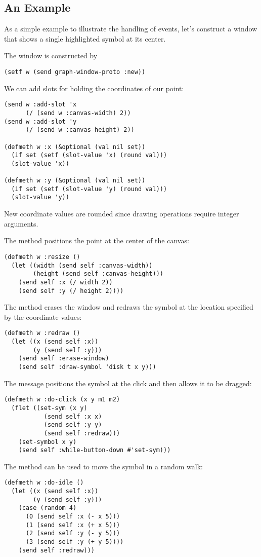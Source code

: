 \begin{slide}{}
\subsection{An Example}
As a simple example to illustrate the handling of events, let's
construct a window that shows a single highlighted symbol at its
center.

The window is constructed by
{\Large
\begin{verbatim}
(setf w (send graph-window-proto :new))
\end{verbatim}}
We can add slots for holding the coordinates of our point:
{\Large
\begin{verbatim}
(send w :add-slot 'x
      (/ (send w :canvas-width) 2))
(send w :add-slot 'y
      (/ (send w :canvas-height) 2))

(defmeth w :x (&optional (val nil set))
  (if set (setf (slot-value 'x) (round val)))
  (slot-value 'x))

(defmeth w :y (&optional (val nil set))
  (if set (setf (slot-value 'y) (round val)))
  (slot-value 'y))
\end{verbatim}}
New coordinate values are rounded since drawing operations require
integer arguments.
\end{slide}

\begin{slide}{}
The  method positions the point at the center of
the canvas:
{\Large
\begin{verbatim}
(defmeth w :resize ()
  (let ((width (send self :canvas-width))
        (height (send self :canvas-height)))
    (send self :x (/ width 2))
    (send self :y (/ height 2))))
\end{verbatim}}
The  method erases the window and redraws
the symbol at the location specified by the coordinate values:
{\Large
\begin{verbatim}
(defmeth w :redraw ()
  (let ((x (send self :x))
        (y (send self :y)))
    (send self :erase-window)
    (send self :draw-symbol 'disk t x y)))
\end{verbatim}}
\end{slide}

\begin{slide}{}
The  message positions the symbol at the click and then
allows it to be dragged:
{\Large
\begin{verbatim}
(defmeth w :do-click (x y m1 m2)
  (flet ((set-sym (x y)
           (send self :x x)
           (send self :y y)
           (send self :redraw)))
    (set-symbol x y)
    (send self :while-button-down #'set-sym)))
\end{verbatim}}
The  method can be used to move the symbol
in a random walk:
{\Large
\begin{verbatim}
(defmeth w :do-idle ()
  (let ((x (send self :x))
        (y (send self :y)))
    (case (random 4)
      (0 (send self :x (- x 5)))
      (1 (send self :x (+ x 5)))
      (2 (send self :y (- y 5)))
      (3 (send self :y (+ y 5))))
    (send self :redraw)))
\end{verbatim}}
\end{slide}

